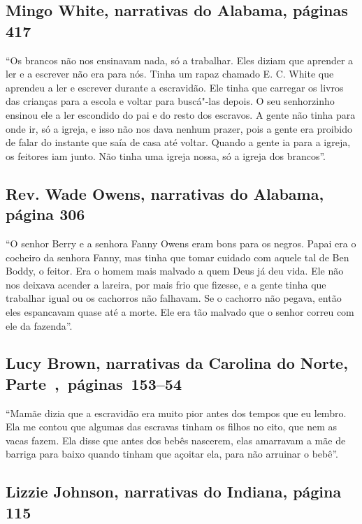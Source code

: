 \subsection{Mingo White, narrativas do Alabama, páginas 417}
\label{ref286}

``Os brancos não nos ensinavam nada, só a trabalhar. Eles diziam que
aprender a ler e a escrever não era para nós. Tinha um rapaz chamado E.
C. White que aprendeu a ler e escrever durante a escravidão. Ele tinha
que carregar os livros das crianças para a escola e voltar para
buscá"-las depois. O seu senhorzinho ensinou ele a ler escondido do pai e
do resto dos escravos. A gente não tinha para onde ir, só a igreja, e
isso não nos dava nenhum prazer, pois a gente era proibido de falar do
instante que saía de casa até voltar. Quando a gente ia para a igreja,
os feitores iam junto. Não tinha uma igreja nossa, só a igreja dos
brancos''.

\subsection{Rev. Wade Owens, narrativas do Alabama, página 306}
\label{ref207}

``O senhor Berry e a senhora Fanny Owens eram bons para os negros. Papai
era o cocheiro da senhora Fanny, mas tinha que tomar cuidado com aquele
tal de Ben Boddy, o feitor. Era o homem mais malvado a quem Deus já deu
vida. Ele não nos deixava acender a lareira, por mais frio que fizesse,
e a gente tinha que trabalhar igual ou os cachorros não falhavam. Se o
cachorro não pegava, então eles espancavam quase até a morte. Ele era
tão malvado que o senhor correu com ele da fazenda''.

\subsection{Lucy Brown, narrativas da Carolina do Norte, Parte~,~páginas~153--54} \label{ref37}

``Mamãe dizia que a escravidão era muito pior antes dos tempos que eu
lembro. Ela me contou que algumas das escravas tinham os filhos no eito,
que nem as vacas fazem. Ela disse que antes dos bebês nascerem, elas
amarravam a mãe de barriga para baixo quando tinham que açoitar ela,
para não arruinar o bebê''.

\subsection{Lizzie Johnson, narrativas do Indiana, página 115}
\label{ref163}

